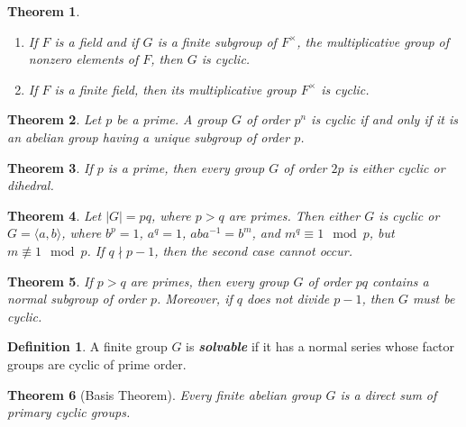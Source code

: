 \documentclass[12pt]{report}
\newtheorem{theorem}{Theorem}[chapter]
\theoremstyle{definition}
\newtheorem*{definition}{Definition}
\newcommand{\term}[1]{\textbf{\textit{#1}}}
\newcommand{\gen}[1]{{\langle}#1{\rangle}}
\renewcommand{\labelenumi}{\textnormal{(\roman{enumi})}}
\begin{document}
\begin{theorem}
	\quad
	\renewcommand{\labelenumi}{\textnormal{(\roman{enumi})}}
	\begin{enumerate}
		\item If $F$ is a field and if $G$ is a finite subgroup of $F^\times$, the multiplicative group of nonzero elements of $F$, then $G$ is cyclic.
		\item If $F$ is a finite field, then its multiplicative group $F^\times$ is cyclic.
	\end{enumerate}
\end{theorem}

\begin{theorem}
	Let $p$ be a prime. A group $G$ of order $p^n$ is cyclic if and only if it is an abelian group having a unique subgroup of order $p$.
\end{theorem}

\begin{theorem}
	If $p$ is a prime, then every group $G$ of order $2p$ is either cyclic or dihedral.
\end{theorem}

\begin{theorem}
	Let $|G|=pq$, where $p>q$ are primes. Then either $G$ is cyclic or $G=\gen{a,b}$, where $b^p=1$, $a^q=1$, $aba^{-1}=b^m$, and $m^q\equiv 1\mod p$, but $m\not\equiv 1\mod p$.
	If $q\nmid p-1$, then the second case cannot occur.
\end{theorem}

\begin{theorem}
	If $p>q$ are primes, then every group $G$ of order $pq$ contains a normal subgroup of order $p$. Moreover, if $q$ does not divide $p-1$, then $G$ must be cyclic.
\end{theorem}

\begin{definition}
	A finite group $G$ is \term{solvable} if it has a normal series whose factor groups are cyclic of prime order.
\end{definition}

\begin{theorem}[Basis Theorem]
	Every finite abelian group $G$ is a direct sum of primary cyclic groups.
\end{theorem}
\end{document}
